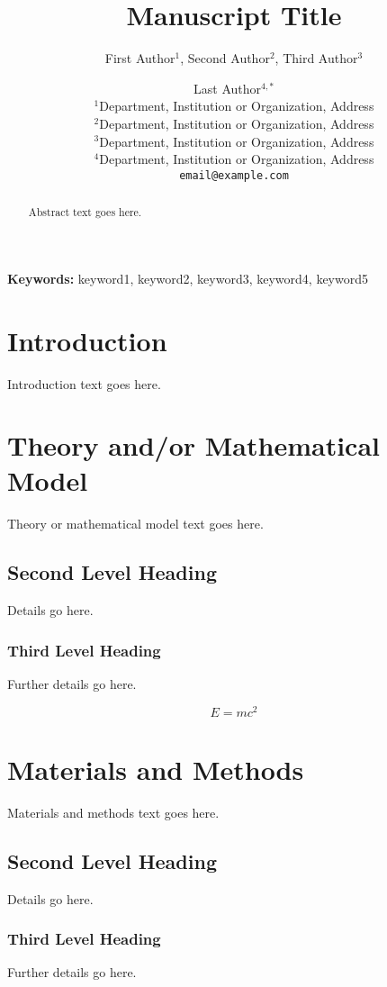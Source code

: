 \documentclass[a4paper, 11pt]{article}
\title{Manuscript Title}
\author{
	First Author$^{1}$, Second Author$^{2}$, Third Author$^{3}$ \and Last Author$^{4,*}$ \\
	$^1$Department, Institution or Organization, Address \\
	$^2$Department, Institution or Organization, Address \\
	$^3$Department, Institution or Organization, Address \\
	$^4$Department, Institution or Organization, Address \\
	\texttt{email@example.com}
}
\date{}
\begin{document}
	
	\maketitle
	
	\begin{abstract}
		Abstract text goes here.
	\end{abstract}
	
	\textbf{Keywords:} keyword1, keyword2, keyword3, keyword4, keyword5
	
	\section{Introduction}
	\linenumbers
	Introduction text goes here.
	
	\section{Theory and/or Mathematical Model}
	Theory or mathematical model text goes here.
	
	\subsection{Second Level Heading}
	Details go here.
	
	\subsubsection{Third Level Heading}
	Further details go here.
	
	\begin{equation}
		E = mc^2
	\end{equation}
	
	\section{Materials and Methods}
	Materials and methods text goes here.
	
	\subsection{Second Level Heading}
	Details go here.
	
	\subsubsection{Third Level Heading}
	Further details go here.
	
\end{document}
